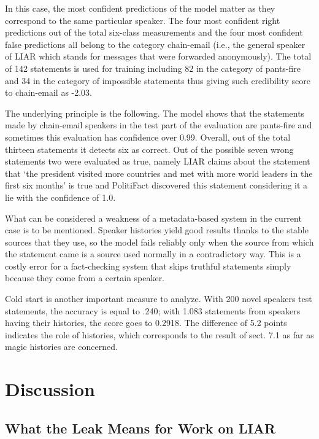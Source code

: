 In this case, the most confident predictions of the model matter as they correspond to the same particular speaker. The four most confident right predictions out of the total six-class measurements and the four most confident false predictions all belong to the category chain-email (i.e., the general speaker of LIAR which stands for messages that were forwarded anonymously). The total of 142 statements is used for training including 82 in the category of pants-fire and 34 in the category of impossible statements thus giving such credibility score to chain-email as -2.03.

The underlying principle is the following. The model shows that the statements made by chain-email speakers in the test part of the evaluation are pants-fire and sometimes this evaluation has confidence over 0.99. Overall, out of the total thirteen statements it detects six as correct. Out of the possible seven wrong statements two were evaluated as true, namely LIAR claims about the statement that `the president visited more countries and met with more world leaders in the first six months' is true and PolitiFact discovered this statement considering it a lie with the confidence of 1.0.

What can be considered a weakness of a metadata-based system in the current case is to be mentioned. Speaker histories yield good results thanks to the stable sources that they use, so the model fails reliably only when the source from which the statement came is a source used normally in a contradictory way. This is a costly error for a fact-checking system that skips truthful statements simply because they come from a certain speaker.

Cold start is another important measure to analyze. With 200 novel speakers test statements, the accuracy is equal to .240; with 1.083 statements from speakers having their histories, the score goes to 0.2918. The difference of 5.2 points indicates the role of histories, which corresponds to the result of sect. 7.1 as far as magic histories are concerned.

\section{Discussion}

\subsection{What the Leak Means for Work on LIAR}

